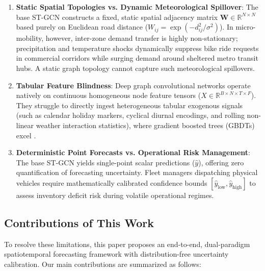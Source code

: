 \documentclass[10pt,journal,compsoc]{IEEEtran}
\begin{document}
\begin{enumerate}
    \item \textbf{Static Spatial Topologies vs. Dynamic Meteorological Spillover}: The base ST-GCN constructs a fixed, static spatial adjacency matrix $\mathbf{W} \in \mathbb{R}^{N \times N}$ based purely on Euclidean road distance ($W_{ij} = \exp(-d_{ij}^2/\sigma^2)$). In micro-mobility, however, inter-zone demand transfer is highly non-stationary; precipitation and temperature shocks dynamically suppress bike ride requests in commercial corridors while surging demand around sheltered metro transit hubs. A static graph topology cannot capture such meteorological spillovers.
    \item \textbf{Tabular Feature Blindness}: Deep graph convolutional networks operate natively on continuous homogeneous node feature tensors ($X \in \mathbb{R}^{B \times N \times T \times F}$). They struggle to directly ingest heterogeneous tabular exogenous signals (such as calendar holiday markers, cyclical diurnal encodings, and rolling non-linear weather interaction statistics), where gradient boosted trees (GBDTs) excel \cite{chen2023weather, zhang2024spatiotemporal}.
    \item \textbf{Deterministic Point Forecasts vs. Operational Risk Management}: The base ST-GCN yields single-point scalar predictions ($\hat{y}$), offering zero quantification of forecasting uncertainty. Fleet managers dispatching physical vehicles require mathematically calibrated confidence bounds $[\hat{y}_{\text{low}}, \hat{y}_{\text{high}}]$ to assess inventory deficit risk during volatile operational regimes.
\end{enumerate}

\subsection{Contributions of This Work}
To resolve these limitations, this paper proposes an end-to-end, dual-paradigm spatiotemporal forecasting framework with distribution-free uncertainty calibration. Our main contributions are summarized as follows:
\end{document}
